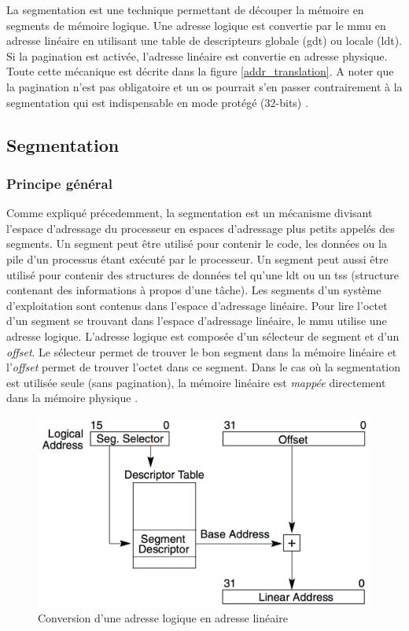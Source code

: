 La segmentation est une technique permettant de découper la mémoire en segments
de mémoire logique. Une adresse logique est convertie par le \acrshort{mmu} en
adresse linéaire en utilisant une table de descripteurs globale (\acrshort{gdt})
ou locale (\acrshort{ldt}). Si la pagination est activée, l'adresse linéaire est
convertie en adresse physique. Toute cette mécanique est décrite dans la figure
\ref{addr_translation}. A noter que la pagination n'est pas obligatoire et un
\acrshort{os} pourrait s'en passer contrairement à la segmentation qui est
indispensable en mode protégé (32-bits) \cite{ref17}.


\subsection{Segmentation}
\subsubsection{Principe général}
Comme expliqué précedemment, la segmentation est un mécanisme divisant l'espace
d'adressage du processeur en espaces d'adressage plus petits appelés des
segments. Un segment peut être utilisé pour contenir le code, les données ou la
pile d'un processus étant exécuté par le processeur. Un segment peut aussi être
utilisé pour contenir des structures de données tel qu'une \acrshort{ldt} ou
un \acrshort{tss} (structure contenant des informations à propos d'une tâche).
Les segments d'un système d'exploitation sont contenus dans l'espace d'adressage
linéaire. Pour lire l'octet d'un segment se trouvant dans l'espace d'adressage
linéaire, le \acrshort{mmu} utilise une adresse logique. L'adresse logique est
composée d'un sélecteur de segment et d'un \textit{offset}. Le sélecteur permet
de trouver le bon segment dans la mémoire linéaire et l'\textit{offset} permet
de trouver l'octet dans ce segment. Dans le cas où la segmentation est utilisée
seule (sans pagination), la mémoire linéaire est \textit{mappée} directement dans
la mémoire physique \cite{ref66}. \\

\begin{figure}[!h]
  \centering
  \includegraphics[scale=0.45]{images/logic_addr_conv.png}
  \caption{Conversion d'une adresse logique en adresse linéaire}
  \label{logic_addr_conv}
\end{figure}

